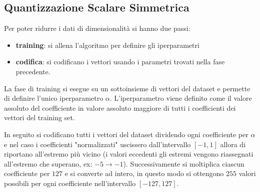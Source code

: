 
\subsection{Quantizzazione Scalare Simmetrica}

Per poter ridurre i dati di dimensionalit\`a si hanno due passi:
\begin{itemize}
    \item \textbf{training}: si allena l'algoritmo per definire gli iperparametri
    \item \textbf{codifica}: si codificano i vettori usando i parametri trovati nella 
    fase precedente.
\end{itemize}

La fase di training si esegue su un sottoinsieme di vettori del dataset e permette 
di definire l'unico iperparametro $\alpha$. L'iperparametro viene definito come 
il valore assoluto del coefficiente in valore assoluto maggiore di tutti i coefficienti 
dei vettori del training set.

In seguito si codificano tutti i vettori del dataset dividendo ogni coefficiente 
per $\alpha$ e nel caso i coefficienti "normalizzati" uscissero dall'intervallo 
$[-1,1]$ allora di riportano all'estremo più vicino (i valori eccedenti gli estremi 
vengono riassegnati all'estremo che superano, ex: $-5 \rightarrow -1$). Successivamente 
si moltiplica ciascun coefficiente per $127$ e si converte ad intero, in questo modo 
si ottengono $255$ valori possibili per ogni coefficiente nell'intervallo $[-127,127]$.

